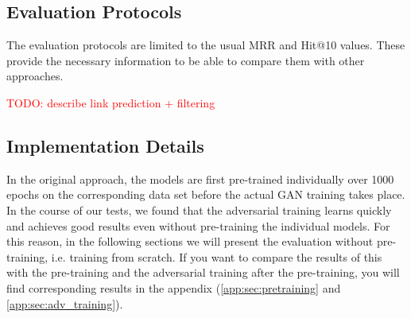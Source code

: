 \subsection{Evaluation Protocols}

The evaluation protocols are limited to the usual MRR and  Hit@10 values.
These provide the necessary information to be able to compare them with other approaches.


\textcolor{red}{TODO: describe link prediction + filtering}

\subsection{Implementation Details}


In the original \kbgan approach, the models are first pre-trained individually over 1000 epochs on the corresponding data set before the actual \ac{GAN} training takes place.
In the course of our tests, we found that the adversarial training learns quickly and achieves good results even without pre-training the individual models.
For this reason, in the following sections we will present the evaluation without pre-training, i.e. training from scratch.
If you want to compare the results of this with the pre-training and the adversarial training after the pre-training, you will find corresponding results in the appendix (\autoref{app:sec:pretraining} and \ref{app:sec:adv_training}).

